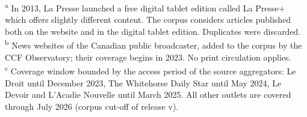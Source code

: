 \documentclass[12pt]{article}
\renewcommand\_{\texttt{\detokenize{_}\allowbreak}}
\begin{document}
\vspace{0.5em}
\noindent\footnotesize\textsuperscript{a} In 2013, La Presse launched a free digital tablet edition called La Presse+ which offers slightly different content. The corpus considers articles published both on the website and in the digital tablet edition. Duplicates were discarded.\\
\textsuperscript{b} News websites of the Canadian public broadcaster, added to the corpus by the CCF Observatory; their coverage begins in 2023. No print circulation applies.\\
\textsuperscript{c} Coverage window bounded by the access period of the source aggregators: Le Droit until December 2023, The Whitehorse Daily Star until May 2024, Le Devoir and L'Acadie Nouvelle until March 2025. All other outlets are covered through July 2026 (corpus cut-off of release v\CCFversion{}).
\endlandscape
\end{document}
